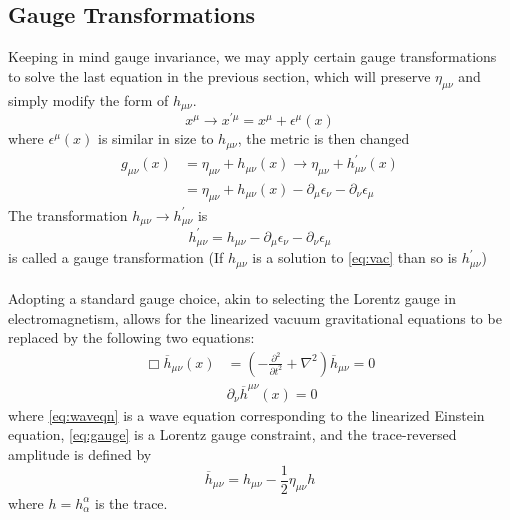 \documentclass[a4paper,12pt]{extarticle}
\newcommand{\mn}{{\mu\nu}}
\numberwithin{equation}{subsection}
\begin{document}
\subsection{Gauge Transformations}
Keeping in mind gauge invariance, we may apply certain gauge transformations to solve the last equation in the previous section, which will preserve $\eta_\mn$ and simply modify the form of $h_\mn$.
\begin{equation}
x^\mu\to x^{'\mu}=x^\mu+\epsilon^\mu(x)
\end{equation}
where $\epsilon^\mu(x)$ is similar in size to $h_\mn$, the metric is then changed
\begin{equation}
\begin{aligned}
g_\mn(x)&=\eta_\mn+h_\mn(x)\to\eta_\mn+h^{'}_\mn(x)\\
&=\eta_\mn+h_\mn(x)-\partial_\mu\epsilon_\nu-\partial_\nu\epsilon_\mu
\end{aligned}
\end{equation}
The transformation $h_\mn \to h^{'}_\mn$ is
\begin{equation}
h^{'}_\mn=h_\mn-\partial_\mu\epsilon_\nu-\partial_\nu\epsilon_\mu
\end{equation}
is called a gauge transformation (If $h_\mn$ is a solution to \eqref{eq:vac} than so is $h^{'}_\mn$)\\
\\
Adopting a standard gauge choice, akin to selecting the Lorentz gauge in electromagnetism, allows for the linearized vacuum gravitational equations to be replaced by the following two equations:
\begin{align}
\Box \overline h_\mn(x)&=\left(-\frac{\partial^2}{\partial t^2}+\nabla^2\right)\overline h_\mn=0 \label{eq:waveqn}\\[.5ex]
&\partial_\nu\overline h^\mn(x)=0 \label{eq:gauge}
\end{align}
where \eqref{eq:waveqn} is a wave equation corresponding to the linearized Einstein equation, \eqref{eq:gauge} is a Lorentz gauge constraint, and the trace-reversed amplitude is defined by
\begin{equation}
\label{eq:trac}
\overline h_\mn=h_\mn-\frac{1}{2}\eta_\mn h
\end{equation}
where $h=h_\alpha^\alpha$ is the trace.
\end{document}
